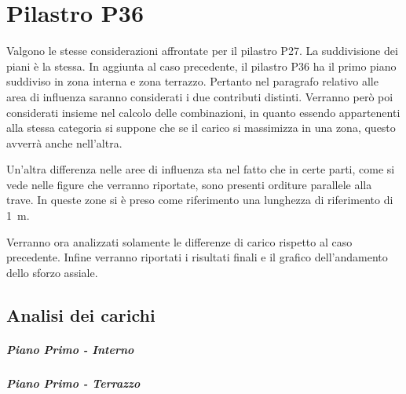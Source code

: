 \chapter{Pilastro P36}
Valgono le stesse considerazioni affrontate per il pilastro P27.
La suddivisione dei piani è la stessa. 
In aggiunta al caso precedente, il pilastro P36 ha il primo piano suddiviso in zona interna e zona terrazzo. 
Pertanto nel paragrafo relativo alle area di influenza saranno considerati i due contributi distinti.
Verranno però poi considerati insieme nel calcolo delle combinazioni, in quanto essendo appartenenti alla stessa categoria si suppone che se il carico si massimizza in una zona, questo avverrà anche nell'altra.

Un'altra differenza nelle aree di influenza sta nel fatto che in certe parti, come si vede nelle figure che verranno riportate, sono presenti orditure parallele alla trave.
In queste zone si è preso come riferimento una lunghezza di riferimento di \SI{1}{\meter}. 

Verranno ora analizzati solamente le differenze di carico rispetto al caso precedente. 
Infine verranno riportati i risultati finali e il grafico dell'andamento dello sforzo assiale.

\section{Analisi dei carichi}
\paragraph*{Piano Primo - Interno}
\paragraph*{Piano Primo - Terrazzo}

